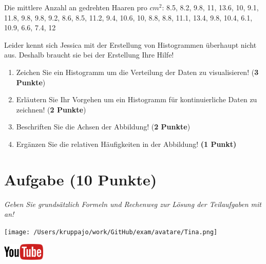 \documentclass[a4paper, 9pt]{scrartcl}\usepackage[]{graphicx}\usepackage[]{xcolor}
\begin{document}
\begin{center}
Die mittlere Anzahl an gedrehten Haaren pro $cm^2$: 8.5, 8.2, 9.8, 11, 13.6, 10, 9.1, 11.8, 9.8, 9.8, 9.2, 8.6, 8.5, 11.2, 9.4, 10.6, 10, 8.8, 8.8, 11.1, 13.4, 9.8, 10.4, 6.1, 10.9, 6.6, 7.4, 12
\end{center}

Leider kennt sich Jessica mit der Erstellung von Histogrammen überhaupt nicht aus. Deshalb braucht sie bei der Erstellung Ihre Hilfe!

\begin{enumerate}
\item Zeichen Sie ein Histogramm um die Verteilung der Daten zu visualisieren! (\textbf{3 Punkte})
 \item Erläutern Sie Ihr Vorgehen um ein Histogramm für kontinuierliche Daten zu zeichnen!  (\textbf{2 Punkte})
\item Beschriften Sie die Achsen der Abbildung! (\textbf{2 Punkte})
\item Ergänzen Sie die relativen Häufigkeiten in der Abbildung! \textbf{(1 Punkt)}  
\end{enumerate}

 
\clearpage

\section{Aufgabe \hfill (10 Punkte)}

\textit{Geben Sie grundsätzlich Formeln und Rechenweg zur Lösung der Teilaufgaben mit an!} \\[1Ex]
 

 
\begin{minipage}[t]{0.5\textwidth}
\texttt{[image: /Users/kruppajo/work/GitHub/exam/avatare/Tina.png]}
\end{minipage}
\begin{minipage}[t]{0.5\textwidth}
\hfill
\href{https://youtu.be/VAqiUdV4WQ0}{\includegraphics[width = 2cm]{img/youtube}}\\[1Ex]
\end{minipage}
\vspace{1ex}
\end{document}
